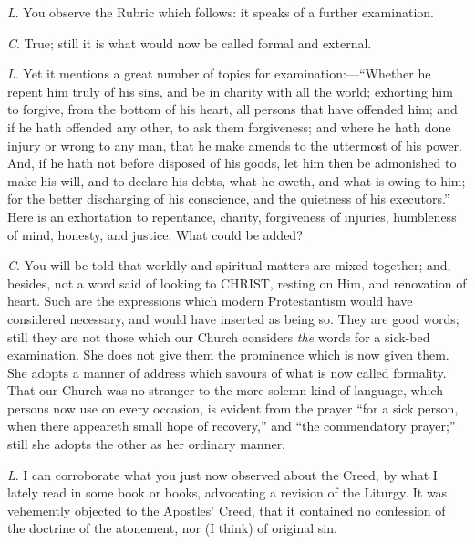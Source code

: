 \emph{L}. You observe the Rubric which follows:
it speaks of a further examination.

\emph{C}. True; still it is what would now be
called formal and external.

\emph{L}. Yet it mentions a great number of
topics for examination:—``Whether he repent him truly of his sins,
and be in charity with all the world; exhorting him to forgive, from
the bottom of his heart, all persons that have offended him; and if he
hath offended any other, to ask them forgiveness; and where he hath
done injury or wrong to any man, that he make amends to the uttermost
of his power. And, if he hath not before disposed of his goods, let
him then be admonished to make his will, and to declare his debts,
what he oweth, and what is owing to him; for the better discharging of
his conscience, and the quietness of his executors.'' Here is an
exhortation to repentance, charity, forgiveness of injuries,
humbleness of mind, honesty, and justice. What could be added?

\emph{C}. You will be told that worldly and
spiritual matters are mixed together; and, besides, not a word said of
looking to CHRIST, resting on
Him, and renovation of heart. Such are the expressions which modern
Protestantism would have considered necessary, and would have inserted
as being so. They are good words; still they are not those which our
Church considers \emph{the} words for a sick-bed examination. She
does not give them the prominence which is now given them. She adopts
a manner of address which savours of what is now called formality.
That our Church was no stranger to the more solemn kind of language,
which persons now use on every occasion, is evident from the prayer ``for
a sick person, when there appeareth small hope of recovery,'' and ``the
commendatory prayer;'' still she adopts the other as her ordinary
manner.

\emph{L}. I can corroborate what you just now
observed about the Creed, by what I lately read in some book or books,
advocating a revision of the Liturgy. It was vehemently objected to
the Apostles' Creed, that it contained no confession of the doctrine
of the atonement, nor (I think) of original sin.


